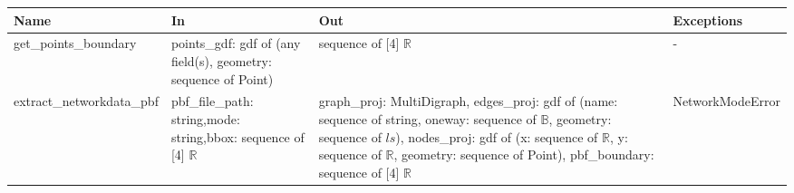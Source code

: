 \documentclass[12pt, titlepage]{article}
\begin{document}
\begin{center}
\begin{tabular}{| >{\raggedright}p{5cm} | >{\raggedright}p{4cm} | >{\raggedright}p{4cm} | l |}
\hline
\textbf{Name} & \textbf{In} & \textbf{Out} & \textbf{Exceptions} \\
\hline
get\_points\_boundary & points\_gdf: gdf of (any field(s), \newline geometry: sequence of Point) & sequence of [4] $\mathbb{R}$ & -\\
\hline
extract\_networkdata\_pbf & pbf\_file\_path: string,\newline mode: string,\newline bbox: sequence of [4] $\mathbb{R}$  & graph\_proj: MultiDigraph, \newline edges\_proj: gdf of (name: sequence of string, \newline oneway: sequence of $\mathbb{B}$, geometry: sequence of $ls$), \newline nodes\_proj: gdf of (x: sequence of $\mathbb{R}$, \newline y: sequence of $\mathbb{R}$, geometry: sequence of Point), \newline pbf\_boundary: sequence of [4] $\mathbb{R}$ & NetworkModeError\\
\hline
\end{tabular}


\end{center}
\end{document}
